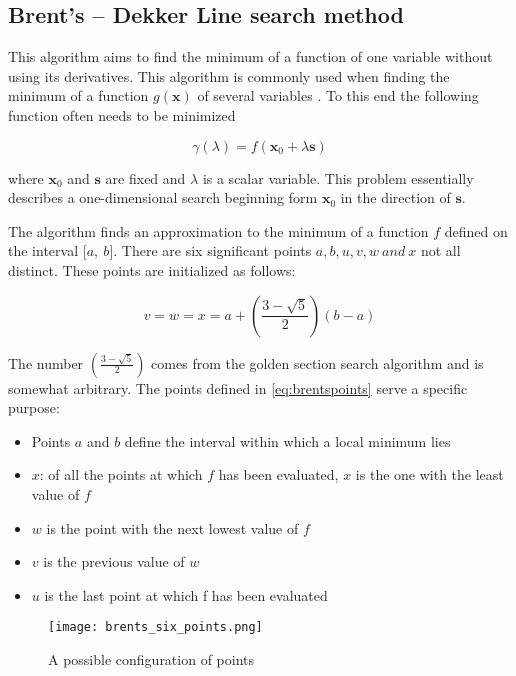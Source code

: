 \subsection{Brent's -- Dekker Line search method }
\label{brents-dekker-line-search-method}

This algorithm aims to find the minimum of a function of one
variable without using its derivatives. This algorithm is commonly used
when finding the minimum of a function $g\left( \mathbf{x} \right)$ of
several variables \cite{brent1973}. To this end the following function often needs to be
minimized

\begin{equation}
    \label{eq:minfun}
\gamma(\lambda) = f(\mathbf{x}_{0} + \lambda\mathbf{s})
\end{equation}

where $\mathbf{x}_{0}$ and $\mathbf{s}$ are fixed and $\lambda$ is
a scalar variable. This problem essentially describes a one-dimensional
search beginning form $\mathbf{x}_{0}$ in the direction of
$\mathbf{s}$.

The algorithm finds an approximation to the minimum of a function $f$
defined on the interval $\lbrack a,\ b\rbrack$. There are six
significant points $a,b,u,v,w\ and\ x$ not all distinct. These points
are initialized as follows:

\begin{equation}
    \label{eq:brentspoints}
v = w = x = a + \left( \frac{3 - \sqrt{5}}{2} \right)(b - a)
\end{equation}

The number $\left( \frac{3 - \sqrt{5}}{2} \right)$ comes from the
golden section search algorithm and is somewhat arbitrary. The points
defined in \eqref{eq:brentspoints} serve a specific purpose:


\begin{itemize}
\item
  Points $a$ and $b$ define the interval within which a local
  minimum lies
\item
  $x$: of all the points at which $f$ has been evaluated, $x$ is
  the one with the least value of $f$
\item
  $w$ is the point with the next lowest value of $f$
\item
  $v$ is the previous value of $w$
\item
  $u$ is the last point at which f has been evaluated
\end{itemize}

\begin{figure}
  \centering
  \texttt{[image: brents\_six\_points.png]}
  \caption{A possible configuration of points \cite{brent1973} }
\end{figure}

